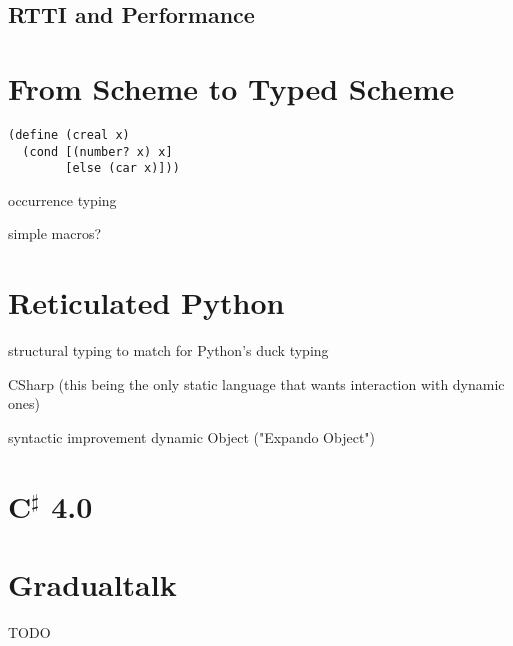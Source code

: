 \subsection{RTTI and Performance}


\section{From Scheme to Typed Scheme}



\begin{verbatim}
(define (creal x)
  (cond [(number? x) x]
        [else (car x)]))
\end{verbatim}

occurrence typing

simple macros?

\section{Reticulated Python}


structural typing to match for Python's duck typing

CSharp (this being the only static language that wants interaction with dynamic ones)

syntactic improvement
dynamic Object ("Expando Object")

\section{C$^\sharp$ 4.0}


\section{Gradualtalk}

TODO